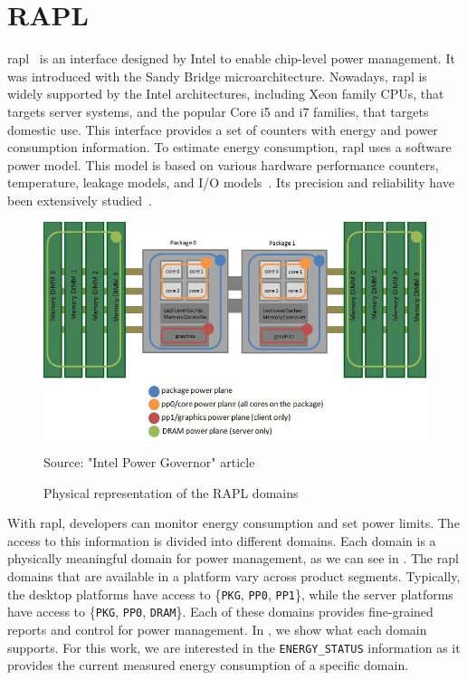 \section{RAPL}\label{sec:rapl}
\ac{rapl}~\cite{david:2010} is an interface designed by Intel to enable chip-level power management. It was introduced with the Sandy Bridge microarchitecture. Nowadays, \acs{rapl} is widely supported by the Intel architectures, including Xeon family CPUs, that targets server systems, and the popular Core i5 and i7 families, that targets domestic use. This interface provides a set of counters with energy and power consumption information. To estimate energy consumption, \acs{rapl} uses a software power model. This model is based on various hardware performance counters, temperature, leakage models, and I/O models~\cite{weaver:2012}. Its precision and reliability have been extensively studied~\cite{rotem:2012,hahnel:2012}.

\begin{savenotes}
\begin{figure}[htp]
  \centering
  \caption{Physical representation of the RAPL domains}
  \includegraphics[width=\columnwidth]{images/power-planes-placeholder}
  \footnotesize{Source: "Intel\textsuperscript{\textregistered} Power Governor" article~\cite{dimitrov:2012}}
  \label{fig:power-planes}
\end{figure}
\end{savenotes}

With \ac{rapl}, developers can monitor energy consumption and set power limits. The access to this information is divided into different domains. Each domain is a physically meaningful domain for power management, as we can see in . The \ac{rapl} domains that are available in a platform vary across product segments. Typically, the desktop platforms have access to \{\texttt{PKG}, \texttt{PP0}, \texttt{PP1}\}, while the server platforms have access to \{\texttt{PKG}, \texttt{PP0}, \texttt{DRAM}\}. Each of these domains provides fine-grained reports and control for power management. In , we show what each domain supports. For this work, we are interested in the \texttt{ENERGY\_STATUS} information as it provides the current measured energy consumption of a specific domain.

